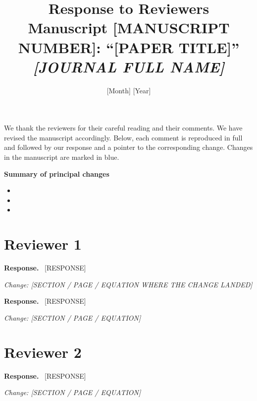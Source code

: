 \documentclass[11pt]{article}
\title{Response to Reviewers\\[4pt]
\large Manuscript [MANUSCRIPT NUMBER]: ``[PAPER TITLE]''\\
\large \emph{[JOURNAL FULL NAME]}}
\author{}
\date{[Month] [Year]}
\newcommand{\reply}{\medskip\noindent\textbf{Response.}\ }
\newcommand{\changed}[1]{\medskip\noindent\textit{Change: #1}}
\begin{document}
\maketitle

\noindent
We thank the reviewers for their careful reading and their comments. We have revised the manuscript
accordingly. Below, each comment is reproduced in full and followed by our response and a pointer to
the corresponding change. Changes in the manuscript are marked in blue.

\bigskip
\noindent
\textbf{Summary of principal changes}

\begin{itemize}
  \item [CHANGE 1 — what changed, where]
  \item [CHANGE 2]
  \item [CHANGE 3]
\end{itemize}

\section*{Reviewer 1}

\reply
[RESPONSE]

\changed{[SECTION / PAGE / EQUATION WHERE THE CHANGE LANDED]}

\reply
[RESPONSE]

\changed{[SECTION / PAGE / EQUATION]}

\section*{Reviewer 2}

\reply
[RESPONSE]

\changed{[SECTION / PAGE / EQUATION]}
\end{document}
